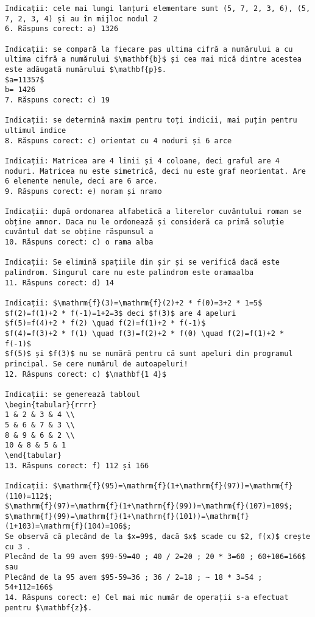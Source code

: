 \begin{verbatim}
Indicații: cele mai lungi lanțuri elementare sunt (5, 7, 2, 3, 6), (5, 7, 2, 3, 4) și au în mijloc nodul 2
6. Răspuns corect: a) 1326

Indicații: se compară la fiecare pas ultima cifră a numărului a cu ultima cifră a numărului $\mathbf{b}$ și cea mai mică dintre acestea este adăugată numărului $\mathbf{p}$.
$a=11357$
b= 1426
7. Răspuns corect: c) 19

Indicații: se determină maxim pentru toți indicii, mai puțin pentru ultimul indice
8. Răspuns corect: c) orientat cu 4 noduri și 6 arce

Indicații: Matricea are 4 linii și 4 coloane, deci graful are 4 noduri. Matricea nu este simetrică, deci nu este graf neorientat. Are 6 elemente nenule, deci are 6 arce.
9. Răspuns corect: e) noram și nramo

Indicații: după ordonarea alfabetică a literelor cuvântului roman se obține amnor. Daca nu le ordonează și consideră ca primă soluție cuvântul dat se obține răspunsul a
10. Răspuns corect: c) o rama alba

Indicații: Se elimină spațiile din șir și se verifică dacă este palindrom. Singurul care nu este palindrom este oramaalba
11. Răspuns corect: d) 14

Indicații: $\mathrm{f}(3)=\mathrm{f}(2)+2 * f(0)=3+2 * 1=5$
$f(2)=f(1)+2 * f(-1)=1+2=3$ deci $f(3)$ are 4 apeluri
$f(5)=f(4)+2 * f(2) \quad f(2)=f(1)+2 * f(-1)$
$f(4)=f(3)+2 * f(1) \quad f(3)=f(2)+2 * f(0) \quad f(2)=f(1)+2 * f(-1)$
$f(5)$ și $f(3)$ nu se numără pentru că sunt apeluri din programul principal. Se cere numărul de autoapeluri!
12. Răspuns corect: c) $\mathbf{1 4}$

Indicații: se generează tabloul
\begin{tabular}{rrrr}
1 & 2 & 3 & 4 \\
5 & 6 & 7 & 3 \\
8 & 9 & 6 & 2 \\
10 & 8 & 5 & 1
\end{tabular}
13. Răspuns corect: f) 112 și 166

Indicații: $\mathrm{f}(95)=\mathrm{f}(1+\mathrm{f}(97))=\mathrm{f}(110)=112$;
$\mathrm{f}(97)=\mathrm{f}(1+\mathrm{f}(99))=\mathrm{f}(107)=109$;
$\mathrm{f}(99)=\mathrm{f}(1+\mathrm{f}(101))=\mathrm{f}(1+103)=\mathrm{f}(104)=106$;
Se observă că plecând de la $x=99$, dacă $x$ scade cu $2, f(x)$ crește cu 3 .
Plecând de la 99 avem $99-59=40 ; 40 / 2=20 ; 20 * 3=60 ; 60+106=166$ sau
Plecând de la 95 avem $95-59=36 ; 36 / 2=18 ; ~ 18 * 3=54 ; 54+112=166$
14. Răspuns corect: e) Cel mai mic număr de operații s-a efectuat pentru $\mathbf{z}$.


\end{verbatim}
